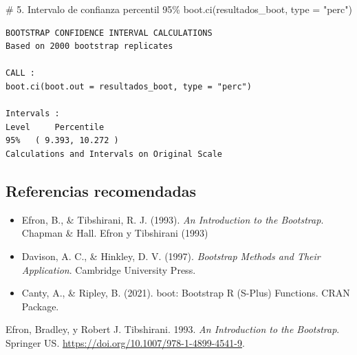 \documentclass[
  spanish,
  11pt,
]{article}
\newenvironment{Shaded}{\begin{snugshade}}{\end{snugshade}}
\newcommand{\AttributeTok}[1]{\textcolor[rgb]{0.40,0.45,0.13}{#1}}
\newcommand{\CommentTok}[1]{\textcolor[rgb]{0.37,0.37,0.37}{#1}}
\newcommand{\FunctionTok}[1]{\textcolor[rgb]{0.28,0.35,0.67}{#1}}
\newcommand{\NormalTok}[1]{\textcolor[rgb]{0.00,0.23,0.31}{#1}}
\newcommand{\StringTok}[1]{\textcolor[rgb]{0.13,0.47,0.30}{#1}}
\newlength{\cslhangindent}
\newenvironment{CSLReferences}[2] %
 {\begin{list}{}{%
  \setlength{\itemindent}{0pt}
  \setlength{\leftmargin}{0pt}
  \setlength{\parsep}{0pt}
  \ifodd #1
   \setlength{\leftmargin}{\cslhangindent}
   \setlength{\itemindent}{-1\cslhangindent}
  \fi
  \setlength{\itemsep}{#2\baselineskip}}}
 {\end{list}}
\begin{document}
\begin{Shaded}
\begin{Highlighting}[]
\CommentTok{\# 5. Intervalo de confianza percentil 95\%}
\FunctionTok{boot.ci}\NormalTok{(resultados\_boot, }\AttributeTok{type =} \StringTok{"perc"}\NormalTok{)}
\end{Highlighting}
\end{Shaded}

\begin{verbatim}
BOOTSTRAP CONFIDENCE INTERVAL CALCULATIONS
Based on 2000 bootstrap replicates

CALL : 
boot.ci(boot.out = resultados_boot, type = "perc")

Intervals : 
Level     Percentile     
95%   ( 9.393, 10.272 )  
Calculations and Intervals on Original Scale
\end{verbatim}

\subsection{\texorpdfstring{\textbf{Referencias
recomendadas}}{Referencias recomendadas}}\label{referencias-recomendadas}

\begin{itemize}
\item
  Efron, B., \& Tibshirani, R. J. (1993). \emph{An Introduction to the
  Bootstrap}. Chapman \& Hall. Efron y Tibshirani (1993)
\item
  Davison, A. C., \& Hinkley, D. V. (1997). \emph{Bootstrap Methods and
  Their Application}. Cambridge University Press.
\item
  Canty, A., \& Ripley, B. (2021). boot: Bootstrap R (S-Plus) Functions.
  CRAN Package.
\end{itemize}

\label{refs}
\begin{CSLReferences}{1}{0}
Efron, Bradley, y Robert J. Tibshirani. 1993. \emph{An Introduction to
the Bootstrap}. Springer US.
\url{https://doi.org/10.1007/978-1-4899-4541-9}.

\end{CSLReferences}
\end{document}
